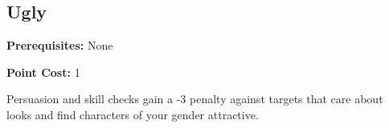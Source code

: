 \subsection{Ugly}\label{feat:ugly}

\noindent
\textbf{Prerequisites:} None

\noindent
\textbf{Point Cost:} 1 

Persuasion and skill checks gain a -3 penalty against targets that care about
looks and find characters of your gender attractive.
